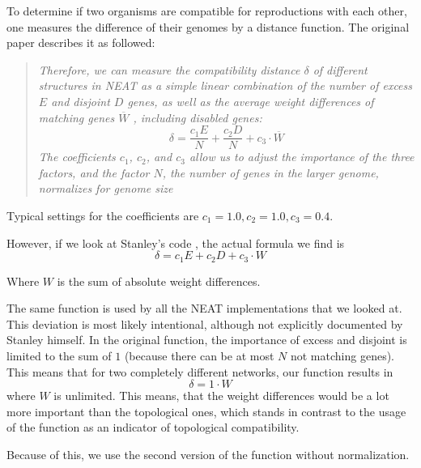 To determine if two organisms are compatible for reproductions with each other, one measures the difference of their genomes by a distance function.  
The original paper describes it as followed:

\begin{quote}
	\emph{Therefore, we
		can measure the compatibility distance \(\delta\) of different structures in NEAT as a simple linear combination of the number of excess \(E\) and disjoint \(D\) genes, as well as the average weight differences of matching genes \(\overline{W}\)
		, including disabled genes:
		\[
		\delta = \frac{c_1 E}{N} + \frac{c_2 D}{N} + c_3 \cdot \overline{W} 
		\]
		The coefficients \(c_1\), \(c_2\), and \(c_3\) allow us to adjust the importance of the three factors, and the factor \(N\), the number of genes in the larger genome, normalizes for genome size}
\end{quote}  

Typical settings for the coefficients are \(c_1 = 1.0, c_2 = 1.0, c_3 = 0.4\).

\cite{Stanley2002}

However, if we look at Stanley's code \cite{Stanley2012}, the actual formula we find is
\[ \delta = c_1 E + c_2 D + c_3 \cdot W \]  

Where \(W\) is the sum of absolute weight differences.

The same function is used by all the NEAT implementations that we looked at.
This deviation is most likely intentional, although not explicitly documented by Stanley himself. In the original function, the importance of excess and disjoint is limited to the sum of \(1\) (because there can be at most \(N\) not matching genes). This means that for two completely different networks, our function results in
\[\delta = 1 \cdot W \]
where \(W\) is unlimited. This means, that the weight differences would be a lot more important than the topological ones, which stands in contrast to the usage of the function as an indicator of topological compatibility. \cite{Green2009}

Because of this, we use the second version of the function without normalization.